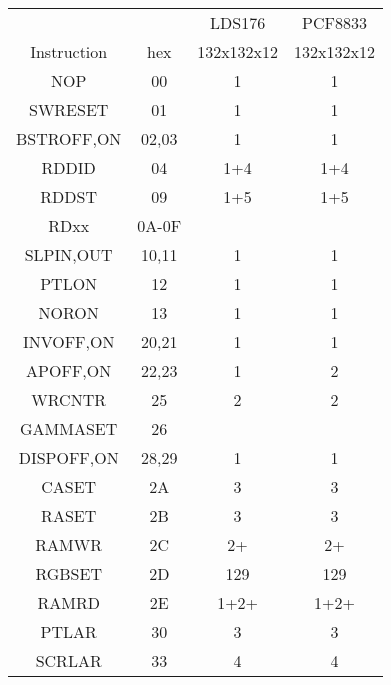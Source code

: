 \documentclass[pdftex,12pt,a4paper,oneside,english]{report}
\begin{document}
\begin{table}[H]
  \begin{center}
    \begin{tabular}{| c | c || c | c |}
    \hline
                &       & LDS176     & PCF8833     \\
    Instruction & hex   & 132x132x12 & 132x132x12  \\
    \hline
    \hline
    NOP         & 00    &     1      &     1       \\
    \hline
    SWRESET     & 01    &     1      &     1       \\
    \hline
    BSTROFF,ON  & 02,03 &     1      &     1       \\
    \hline
    RDDID       & 04    &     1+4    &     1+4     \\
    \hline
    RDDST       & 09    &     1+5    &     1+5     \\
    \hline
    RDxx        & 0A-0F &            &             \\
    \hline
    SLPIN,OUT   & 10,11 &     1      &     1       \\
    \hline
    PTLON       & 12    &     1      &     1       \\
    \hline
    NORON       & 13    &     1      &     1       \\
    \hline
    INVOFF,ON   & 20,21 &     1      &     1       \\
    \hline
    APOFF,ON    & 22,23 &     1      &     2       \\
    \hline
    WRCNTR      & 25    &     2      &     2       \\
    \hline
    GAMMASET    & 26    &            &             \\
    \hline
    DISPOFF,ON  & 28,29 &     1      &     1       \\
    \hline
    CASET       & 2A    &     3      &     3       \\
    \hline
    RASET       & 2B    &     3      &     3       \\
    \hline
    RAMWR       & 2C    &     2+     &     2+      \\
    \hline
    RGBSET      & 2D    &    129     &    129      \\
    \hline
    RAMRD       & 2E    &     1+2+   &     1+2+    \\
    \hline
    PTLAR       & 30    &     3      &     3       \\
    \hline
    SCRLAR      & 33    &     4      &     4       \\

\end{tabular}
\end{center}
\end{table}
\end{document}
